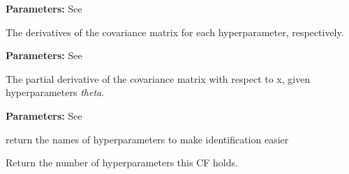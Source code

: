 \documentclass[letterpaper,10pt,english]{sphinxmanual}
\begin{document}
\begin{fulllineitems}
\begin{fulllineitems}
\textbf{Parameters:}
See {\hyperref[covars:pygp.covar.CovarianceFunction]{}}

\end{fulllineitems}


\begin{fulllineitems}
\label{covars:pygp.covar.se.SqexpCFARD.Kgrad_theta}
The derivatives of the covariance matrix for
each hyperparameter, respectively.

\textbf{Parameters:}
See {\hyperref[covars:pygp.covar.CovarianceFunction]{}}

\end{fulllineitems}


\begin{fulllineitems}
\label{covars:pygp.covar.se.SqexpCFARD.Kgrad_x}
The partial derivative of the covariance matrix with
respect to x, given hyperparameters \emph{theta}.

\textbf{Parameters:}
See {\hyperref[covars:pygp.covar.CovarianceFunction]{}}

\end{fulllineitems}


\begin{fulllineitems}
\label{covars:pygp.covar.se.SqexpCFARD.get_hyperparameter_names}
return the names of hyperparameters to
make identification easier

\end{fulllineitems}


\begin{fulllineitems}
\label{covars:pygp.covar.se.SqexpCFARD.get_number_of_parameters}
Return the number of hyperparameters this CF holds.

\end{fulllineitems}


\end{fulllineitems}
\end{document}
